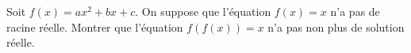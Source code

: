 Soit $f(x) = ax^2 + bx + c$. On suppose que l'équation $f(x) = x$ n'a pas de racine réelle. Montrer que l'équation $f(f(x)) = x$ n'a pas non plus de solution réelle.
